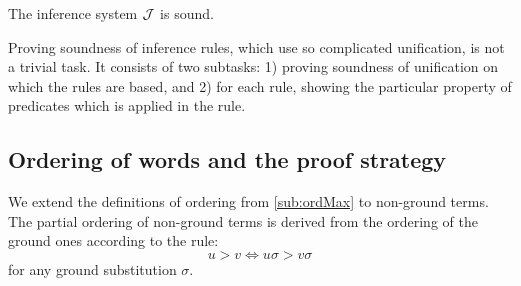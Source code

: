 \begin{THEOREM} \label{th:soundnessNG}
The inference system $\mbox {$\cal J$}$ is sound.
\end{THEOREM}
\begin{PROOF} 
Proving soundness of inference rules, which use so complicated
unification, is not a trivial task. It consists of two subtasks: 1) proving
soundness of unification on which the rules are based, and 2) for each rule, 
showing the particular property of predicates which is applied in the rule.
\end{PROOF}

\subsection{Ordering of words and the proof strategy}\label {se:strategy}
We extend the definitions of ordering from \ref{sub:ordMax} to non-ground terms.
The partial ordering of
non-ground terms is derived from the ordering of the ground ones
according to the rule: %
\begin{equation} \label{eq:ord-non-ground}
u > v \iff u\sigma > v\sigma
\end{equation}
for any ground substitution $\sigma$.

